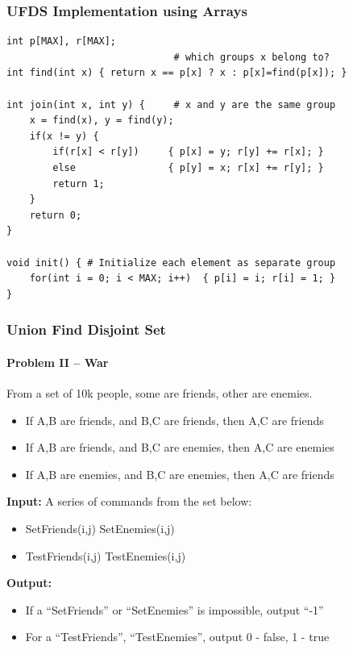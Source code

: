 \begin{frame}[fragile]
  \frametitle{UFDS Implementation using Arrays}

  {\small
\begin{verbatim}
int p[MAX], r[MAX];
                             # which groups x belong to?
int find(int x) { return x == p[x] ? x : p[x]=find(p[x]); }

int join(int x, int y) {     # x and y are the same group
    x = find(x), y = find(y);
    if(x != y) {
        if(r[x] < r[y])     { p[x] = y; r[y] += r[x]; }
        else                { p[y] = x; r[x] += r[y]; }
        return 1;
    }
    return 0;
}

void init() { # Initialize each element as separate group
    for(int i = 0; i < MAX; i++)  { p[i] = i; r[i] = 1; }
}
\end{verbatim}
}

\end{frame}

\begin{frame}
  \frametitle{Union Find Disjoint Set}
  \framesubtitle{Problem II -- War}
  {\small
  \begin{block}{}
    From a set of 10k people, some are friends, other are enemies.
    \begin{itemize}
      \item If A,B are friends, and B,C are friends, then A,C are friends
      \item If A,B are friends, and B,C are enemies, then A,C are enemies
      \item If A,B are enemies, and B,C are enemies, then A,C are friends
    \end{itemize}

    {\bf Input:} A series of commands from the set below:
    \begin{itemize}
    \item SetFriends(i,j) \hspace{1.1cm} SetEnemies(i,j)
    \item TestFriends(i,j) \hspace{1cm} TestEnemies(i,j)
    \end{itemize}

    {\bf Output:}
    \begin{itemize}
    \item If a ``SetFriends'' or ``SetEnemies'' is impossible, output ``-1''
    \item For a ``TestFriends'', ``TestEnemies'', output 0 - false, 1 - true
    \end{itemize}
  \end{block}}

\end{frame}

